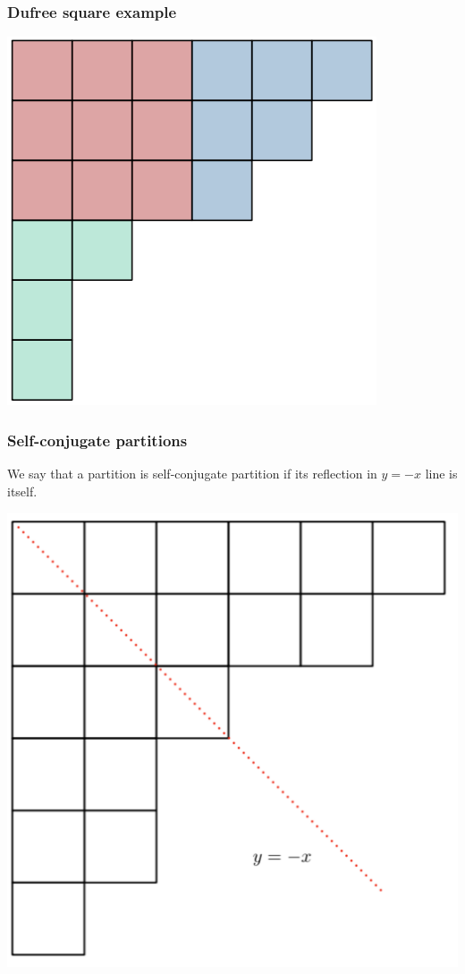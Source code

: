 \documentclass{beamer}
\begin{document}
\begin{frame}
\frametitle{Dufree square example}
\centering
\includegraphics[scale = 0.55]{dufree.png}	
\end{frame}


 
\begin{frame}
	\frametitle{Self-conjugate partitions}
\begin{definition}
We say that a partition is self-conjugate partition if its reflection in $y = -x$ line is itself.	
\end{definition}

\centering
\includegraphics[scale = 0.25]{self_conjugate_with_line.png}
\end{frame}  
\end{document}
